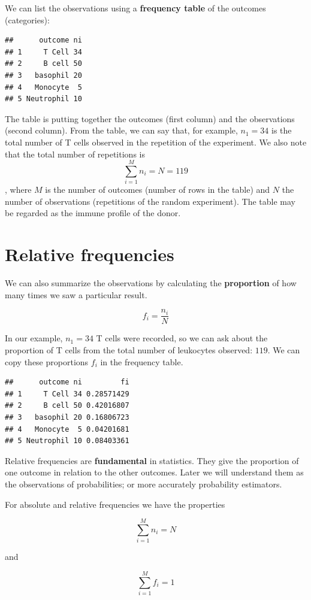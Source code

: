 \documentclass[
]{book}
\begin{document}
We can list the observations using a \textbf{frequency table} of the outcomes (categories):

\begin{verbatim}
##      outcome ni
## 1     T Cell 34
## 2     B cell 50
## 3   basophil 20
## 4   Monocyte  5
## 5 Neutrophil 10
\end{verbatim}

The table is putting together the outcomes (first column) and the observations (second column). From the table, we can say that, for example, \(n_1=34\) is the total number of T cells observed in the repetition of the experiment. We also note that the total number of repetitions is \[\sum_{i=1}^M n_i= N = 119\], where \(M\) is the number of outcomes (number of rows in the table) and \(N\) the number of observations (repetitions of the random experiment). The table may be regarded as the immune profile of the donor.

\hypertarget{relative-frequencies}{%
\section{Relative frequencies}\label{relative-frequencies}}

We can also summarize the observations by calculating the \textbf{proportion} of how many times we saw a particular result.

\[f_i = \frac{n_i}{N}\]

In our example, \(n_1=34\) T cells were recorded, so we can ask about the proportion of T cells from the total number of leukocytes observed: \(119\). We can copy these proportions \(f_i\) in the frequency table.

\begin{verbatim}
##      outcome ni         fi
## 1     T Cell 34 0.28571429
## 2     B cell 50 0.42016807
## 3   basophil 20 0.16806723
## 4   Monocyte  5 0.04201681
## 5 Neutrophil 10 0.08403361
\end{verbatim}

Relative frequencies are \textbf{fundamental} in statistics. They give the proportion of one outcome in relation to the other outcomes. Later we will understand them as the observations of probabilities; or more accurately probability estimators.

For absolute and relative frequencies we have the properties

\[\sum_{i=1}^M n_i = N\]

and

\[\sum_{i=1}^M f_i = 1\]
\end{document}
